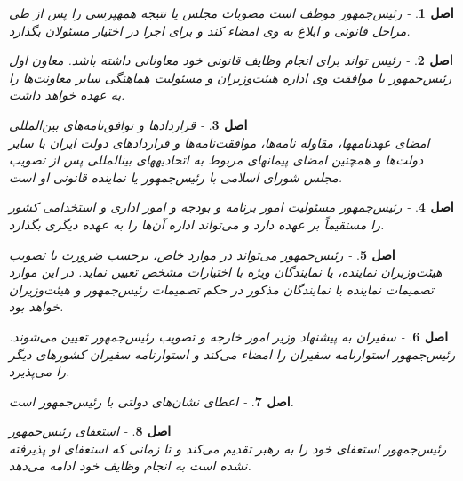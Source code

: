 \documentclass[12pt]{article}
\newtheorem{asl}{اصل}
\begin{document}
\begin{asl}- 
رئیس‌جمهور موظف است مصوبات مجلس یا نتیجه همه‏پرسی را پس از طی مراحل قانونی و ابلاغ به وی امضاء کند و برای اجرا در اختیار مسئولان بگذارد. 
\end{asl}

\begin{asl}- 
رئیس‌
‌تواند برای انجام وظایف قانونی خود معاونانی داشته باشد. 
معاون اول رئیس‌جمهور با موافقت وی اداره هیئت‌وزیران و مسئولیت هماهنگی سایر معاونت‌ها را به عهده خواهد داشت. 

\end{asl}

\begin{asl}- 
قراردادها و توافق‌نامه‌های بین‌المللی 
\\
امضای عهدنامه‏ها، مقاوله نامه‌ها، موافقت‌نامه‌ها و قراردادهای دولت ایران با سایر دولت‌ها و همچنین امضای پیمان‏های مربوط به اتحادیه‏های بین‏المللی پس از تصویب مجلس شورای اسلامی با رئیس‌جمهور یا نماینده قانونی او است. 

\end{asl}

\begin{asl}- 
رئیس‌جمهور مسئولیت امور برنامه و بودجه و امور اداری و استخدامی کشور را مستقیماً بر عهده دارد و می‌تواند اداره آن‌ها را به عهده دیگری بگذارد. 
\end{asl}

\begin{asl}- 
رئیس‌جمهور می‌تواند در موارد خاص، برحسب ضرورت با تصویب هیئت‌وزیران نماینده، یا نمایندگان ویژه با اختیارات مشخص تعیین نماید. در این موارد تصمیمات نماینده یا نمایندگان مذکور در حکم تصمیمات رئیس‌جمهور و هیئت‌وزیران خواهد بود. 
\end{asl}

\begin{asl}- 
سفیران به پیشنهاد وزیر امور خارجه و تصویب رئیس‌جمهور تعیین می‌شوند. رئیس‌جمهور استوارنامه سفیران را امضاء می‌کند و استوارنامه سفیران کشورهای دیگر را می‌پذیرد. 
\end{asl}

\begin{asl}- 
اعطای نشان‌های دولتی با رئیس‌جمهور است. 
\end{asl}

\begin{asl}- 
استعفای رئیس‌جمهور 
\\
رئیس‌جمهور استعفای خود را به رهبر تقدیم می‌کند و تا زمانی که استعفای او پذیرفته نشده است به انجام وظایف خود ادامه می‌دهد. 
\end{asl}
\end{document}
